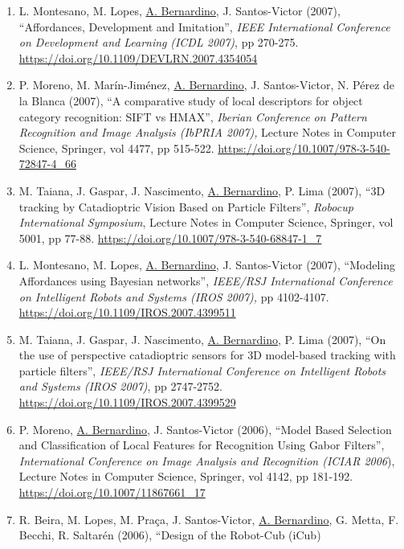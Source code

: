 \begin{enumerate}
  ``Sample-Based 3D Tracking of Colored Objects : A Flexible
  Architecture'', \emph{British Machine Vision Conference (BMVC 2008)},
  pp 1-10. \url{https://doi.org/10.5244/C.22.82}~
\item
  L. Montesano, M. Lopes, \ul{A. Bernardino}, J. Santos-Victor (2007),
  ``Affordances, Development and Imitation'', \emph{IEEE International
  Conference on Development and Learning} \emph{(ICDL 2007)}, pp
  270-275. \url{https://doi.org/10.1109/DEVLRN.2007.4354054}~~
\item
  P. Moreno, M. Marín-Jiménez, \ul{A. Bernardino}, J. Santos-Victor, N.
  Pérez de la Blanca (2007), ``A comparative study of local descriptors
  for object category recognition: SIFT vs HMAX'', \emph{Iberian
  Conference on Pattern Recognition and Image Analysis (IbPRIA 2007),}
  Lecture Notes in Computer Science, Springer, vol 4477, pp 515-522.
  \url{https://doi.org/10.1007/978-3-540-72847-4_66}~
\item
  M. Taiana, J. Gaspar, J. Nascimento, \ul{A. Bernardino}, P. Lima
  (2007), ``3D tracking by Catadioptric Vision Based on Particle
  Filters'', \emph{Robocup International Symposium}, Lecture Notes in
  Computer Science, Springer, vol 5001, pp 77-88.
  \url{https://doi.org/10.1007/978-3-540-68847-1_7}~
\item
  L. Montesano, M. Lopes, \ul{A. Bernardino}, J. Santos-Victor (2007),
  ``Modeling Affordances using Bayesian networks'', \emph{IEEE/RSJ
  International Conference on Intelligent Robots and Systems (IROS
  2007),} pp 4102-4107. \url{https://doi.org/10.1109/IROS.2007.4399511}~
\item
  M. Taiana, J. Gaspar, J. Nascimento, \ul{A. Bernardino}, P. Lima
  (2007), ``On the use of perspective catadioptric sensors for 3D
  model-based tracking with particle filters'', \emph{IEEE/RSJ
  International Conference on Intelligent Robots and Systems (IROS
  2007)}, pp 2747-2752. \url{https://doi.org/10.1109/IROS.2007.4399529}
  ~
\item
  P. Moreno, \ul{A. Bernardino}, J. Santos-Victor (2006), ``Model Based
  Selection and Classification of Local Features for Recognition Using
  Gabor Filters'', \emph{International Conference on Image Analysis and
  Recognition (ICIAR 2006}), Lecture Notes in Computer Science,
  Springer, vol 4142, pp 181-192.
  \url{https://doi.org/10.1007/11867661_17}~
\item
  R. Beira, M. Lopes, M. Praça, J. Santos-Victor, \ul{A. Bernardino}, G.
  Metta, F. Becchi, R. Saltarén (2006), ``Design of the Robot-Cub (iCub)

\end{enumerate}
